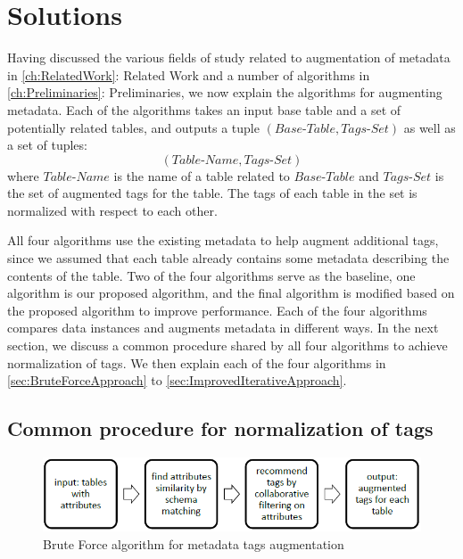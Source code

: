 
\chapter{Solutions}
\label{ch:Solutions}

Having discussed the various fields of study related to augmentation of metadata in \autoref{ch:RelatedWork}: Related Work and a number of algorithms in \autoref{ch:Preliminaries}: Preliminaries, we now explain the algorithms for augmenting metadata. Each of the algorithms takes an input base table and a set of potentially related tables, and outputs a tuple $(\textit{Base-Table}, \textit{Tags-Set})$ as well as a set of tuples:
\[
(\textit{Table-Name},\textit{Tags-Set})
\]
where $\textit{Table-Name}$ is the name of a table related to $\textit{Base-Table}$ and $\textit{Tags-Set}$ is the set of augmented tags for the table. The tags of each table in the set is normalized with respect to each other.

All four algorithms use the existing metadata to help augment additional tags, since we assumed that each table already contains some metadata describing the contents of the table. Two of the four algorithms serve as the baseline, one algorithm is our proposed algorithm, and the final algorithm is modified based on the proposed algorithm to improve performance. Each of the four algorithms compares data instances and augments metadata in different ways. In the next section, we discuss a common procedure shared by all four algorithms to achieve normalization of tags. We then explain each of the four algorithms in \autoref{sec:BruteForceApproach} to \autoref{sec:ImprovedIterativeApproach}.

\section{Common procedure for normalization of tags}
\label{sec:CommonProcedureForNormalizationOfTags}

\begin{figure}
    \centering
    \includegraphics[width=5in]{figures/brute-force-algorithm.png}
    \caption{Brute Force algorithm for metadata tags augmentation}
    \label{fig:brute-force-algorithm}
\end{figure}

